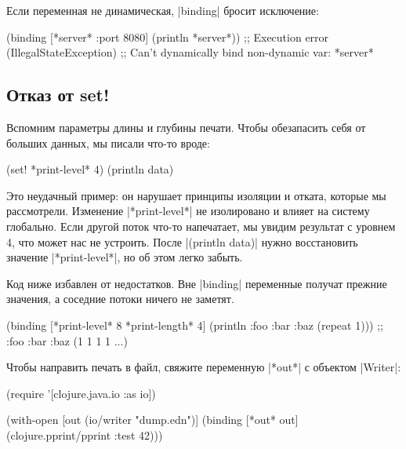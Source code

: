 \noindent
Если переменная не динамическая, \spverb|binding| бросит исключение:

\begin{english}
  \begin{clojure}
(binding [*server* {:port 8080}]
  (println *server*))
;; Execution error (IllegalStateException)
;; Can't dynamically bind non-dynamic var: *server*
  \end{clojure}
\end{english}

\subsection{Отказ от set!}

Вспомним параметры длины и глубины печати. Чтобы обезапасить себя от больших
данных, мы писали что-то вроде:

\begin{english}
  \begin{clojure}
(set! *print-level* 4)
(println data)
  \end{clojure}
\end{english}

Это неудачный пример: он нарушает принципы изоляции и отката, которые мы
рассмотрели. Изменение \spverb|*print-level*| не изолировано и влияет на систему
глобально. Если другой поток что-то напечатает, мы увидим результат с уровнем 4,
что может нас не устроить. После \spverb|(println data)| нужно
восстановить значение \spverb|*print-level*|, но об этом легко забыть.

Код ниже избавлен от недостатков. Вне \spverb|binding| переменные получат
прежние значения, а соседние потоки ничего не заметят.

\begin{english}
  \begin{clojure}
(binding [*print-level* 8
          *print-length* 4]
  (println {:foo {:bar {:baz (repeat 1)}}}))
;; {:foo {:bar {:baz (1 1 1 1 ...)}}}
  \end{clojure}
\end{english}

Чтобы направить печать в файл, свяжите переменную \spverb|*out*| с объектом
\spverb|Writer|:

\begin{english}
  \begin{clojure}
(require '[clojure.java.io :as io])

(with-open [out (io/writer "dump.edn")]
  (binding [*out* out]
    (clojure.pprint/pprint {:test 42})))
  \end{clojure}
\end{english}

